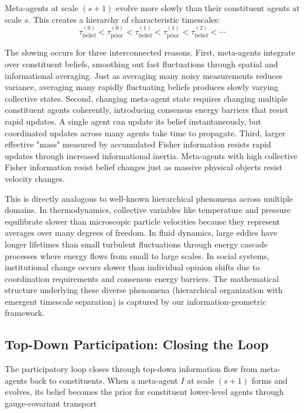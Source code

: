 \documentclass[11pt]{article}
\begin{document}
Meta-agents at scale $(s+1)$ evolve more slowly than their constituent agents at scale $s$. This creates a hierarchy of characteristic timescales:
\begin{equation}
\tau_{\text{belief}}^{(0)} < \tau_{\text{prior}}^{(0)} < \tau_{\text{belief}}^{(1)} < \tau_{\text{prior}}^{(1)} < \tau_{\text{belief}}^{(2)} < \cdots
\end{equation}

The slowing occurs for three interconnected reasons. First, meta-agents integrate over constituent beliefs, smoothing out fast fluctuations through spatial and informational averaging. Just as averaging many noisy measurements reduces variance, averaging many rapidly fluctuating beliefs produces slowly varying collective states. Second, changing meta-agent state requires changing multiple constituent agents coherently, introducing consensus energy barriers that resist rapid updates. A single agent can update its belief instantaneously, but coordinated updates across many agents take time to propagate. Third, larger effective "mass" measured by accumulated Fisher information resists rapid updates through increased informational inertia. Meta-agents with high collective Fisher information resist belief changes just as massive physical objects resist velocity changes.

This is directly analogous to well-known hierarchical phenomena across multiple domains. In thermodynamics, collective variables like temperature and pressure equilibrate slower than microscopic particle velocities because they represent averages over many degrees of freedom. In fluid dynamics, large eddies have longer lifetimes than small turbulent fluctuations through energy cascade processes where energy flows from small to large scales. In social systems, institutional change occurs slower than individual opinion shifts due to coordination requirements and consensus energy barriers. The mathematical structure underlying these diverse phenomena (hierarchical organization with emergent timescale separation) is captured by our information-geometric framework.


\subsection{Top-Down Participation: Closing the Loop}

The participatory loop closes through top-down information flow from meta-agents back to constituents. When a meta-agent $I$ at scale $(s+1)$ forms and evolves, its belief becomes the prior for constituent lower-level agents through gauge-covariant transport
\end{document}
